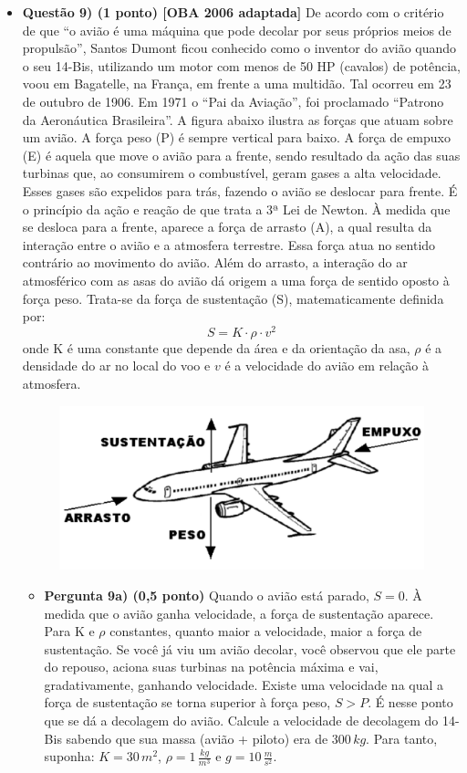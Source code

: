 \documentclass[a4paper, 12pt]{article}
\begin{document}
\begin{flushleft}
\begin{itemize}
            \item \textbf{Questão 9) (1 ponto) [OBA 2006 adaptada]} De acordo com o critério de que “o avião é uma máquina que pode decolar por seus próprios meios de propulsão”, Santos Dumont ficou conhecido como o inventor do avião quando o seu 14-Bis, utilizando um motor com menos de 50 HP (cavalos) de potência, voou em Bagatelle, na França, em frente a uma multidão. Tal ocorreu em 23 de outubro de 1906. Em 1971 o “Pai da Aviação”, foi proclamado “Patrono da Aeronáutica Brasileira”. A figura abaixo ilustra as forças que atuam sobre um avião. A força peso (P) é sempre vertical para baixo. A força de empuxo (E) é aquela que move o avião para a frente, sendo resultado da ação das suas turbinas que, ao consumirem o combustível, geram gases a alta velocidade. Esses gases são expelidos para trás, fazendo o avião se deslocar para frente. É o princípio da ação e reação de que trata a 3ª Lei de Newton. À medida que se desloca para a frente, aparece a força de arrasto (A), a qual resulta da interação entre o avião e a atmosfera terrestre. Essa força atua no sentido contrário ao movimento do avião. Além do arrasto, a interação do ar atmosférico com as asas do avião dá origem a uma força de sentido oposto à força peso. Trata-se da força de sustentação (S), matematicamente definida por: $$S = K \cdot \rho \cdot v^2$$ onde K é uma constante que depende da área e da orientação da asa, $\rho$ é a densidade do ar no local do voo e $v$ é a velocidade do avião em relação à atmosfera.
                \begin{figure}[H]
                    \centering
                    \includegraphics[scale=0.25]{img/9.png}
                \end{figure}
                \begin{itemize}
                    \item \textbf{Pergunta 9a) (0,5 ponto)} Quando o avião está parado, $S = 0$. À medida que o avião ganha velocidade, a força de sustentação aparece. Para K e $\rho$ constantes, quanto maior a velocidade, maior a força de sustentação. Se você já viu um avião decolar, você observou que ele parte do repouso, aciona suas turbinas na potência máxima e vai, gradativamente, ganhando velocidade. Existe uma velocidade na qual a força de sustentação se torna superior à força peso, $S > P$. É nesse ponto que se dá a decolagem do avião. Calcule a velocidade de decolagem do 14-Bis sabendo que sua massa (avião + piloto) era de $300 \, kg$. Para tanto, suponha: $K = 30 \, m^2$, $\rho = 1 \, \frac{kg}{m^3}$ e $g = 10 \, \frac{m}{s^2}$.

\end{itemize}
\end{itemize}
\end{flushleft}
\end{document}
